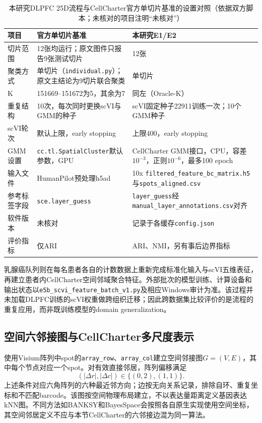 \begin{table}[htbp]
\centering
\caption{本研究DLPFC 25D流程与CellCharter官方单切片基准的设置对照（依据双方脚本；未核对的项目注明“未核对”）}
\label{tab:cc-official-protocol-rev-p0}
\small
\begin{tabularx}{\linewidth}{p{2.6cm}XX}
\toprule
项目 & 官方单切片基准\cite{cellcharteranalyses2024} & 本研究E1/E2\\
\midrule
切片范围 & 12张均运行；原文图件只报告9张测试切片 & 12张\\
聚类方式 & 单切片（\texttt{individual.py}）；原文主结论为9切片联合聚类 & 单切片\\
K & 151669--151672为5，其余为7 & 同左（Oracle-K）\\
重复结构 & 10次，每次同时更换scVI与GMM的种子 & scVI固定种子22911训练一次；10个GMM种子\\
scVI轮次 & 默认上限，early stopping & 上限400，early stopping\\
GMM设置 & \texttt{cc.tl.SpatialCluster}默认参数，GPU & CellCharter GMM接口，CPU，容差$10^{-3}$，正则$10^{-6}$，最多100 epoch\\
输入文件 & HumanPilot预处理h5ad & 10x \texttt{filtered\_feature\_bc\_matrix.h5}与\texttt{spots\_aligned.csv}\\
参考标签字段 & \texttt{sce.layer\_guess} & \texttt{layer\_guess}经\texttt{manual\_layer\_annotations.csv}对齐\\
软件版本 & 未核对 & 记录于各缓存\texttt{config.json}\\
评价指标 & 仅ARI & ARI、NMI，另有事后边界指标\\
\bottomrule
\end{tabularx}
\end{table}

乳腺癌队列则在每名患者各自的计数数据上重新完成标准化输入与scVI五维表征，再建立患者内CellCharter空间邻域聚合特征。外部批次的模型训练、计算设备和输出状态以\texttt{e5b\_scvi\_feature\_batch\_v1.py}及相应Windows审计为准。该过程并未加载DLPFC训练的scVI权重做跨组织迁移；因此跨数据集比较评价的是流程的重复应用，而非既训练模型的domain generalization。

\subsection{空间六邻接图与CellCharter多尺度表示}
\label{subsec:cc-spatial-v1}

使用Visium阵列中spot的\texttt{array\_row}、\texttt{array\_col}建立空间邻接图$G=(V,E)$，其中每个节点对应一个spot。对有效直接邻居，阵列偏移满足
\begin{equation}
(|\Delta r|,|\Delta c|)\in\{(0,2),(1,1)\}.
\label{eq:cc-hex-v1}
\end{equation}
上述条件对应六角阵列的六种最近邻方向；边按无向关系记录，排除自环、重复坐标和不匹配barcode。该图按空间物理布局建立，不以表达量距离定义基因表达kNN图。不同方法如BANKSY和BayesSpace会按照各自原生实现使用空间坐标，其空间邻居定义不应与本节CellCharter的六邻接边混为同一算法。

